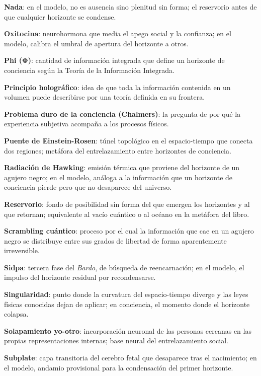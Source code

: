 \glos \textbf{Nada}: en el modelo, no es ausencia sino plenitud sin forma; el reservorio antes de que cualquier horizonte se condense.

\glos \textbf{Oxitocina}: neurohormona que media el apego social y la confianza; en el modelo, calibra el umbral de apertura del horizonte a otros.

\glos \textbf{Phi (Φ)}: cantidad de información integrada que define un horizonte de conciencia según la Teoría de la Información Integrada.

\glos \textbf{Principio holográfico}: idea de que toda la información contenida en un volumen puede describirse por una teoría definida en su frontera.

\glos \textbf{Problema duro de la conciencia (Chalmers)}: la pregunta de por qué la experiencia subjetiva acompaña a los procesos físicos.

\glos \textbf{Puente de Einstein-Rosen}: túnel topológico en el espacio-tiempo que conecta dos regiones; metáfora del entrelazamiento entre horizontes de conciencia.

\glos \textbf{Radiación de Hawking}: emisión térmica que proviene del horizonte de un agujero negro; en el modelo, análoga a la información que un horizonte de conciencia pierde pero que no desaparece del universo.

\glos \textbf{Reservorio}: fondo de posibilidad sin forma del que emergen los horizontes y al que retornan; equivalente al vacío cuántico o al océano en la metáfora del libro.

\glos \textbf{Scrambling cuántico}: proceso por el cual la información que cae en un agujero negro se distribuye entre sus grados de libertad de forma aparentemente irreversible.

\glos \textbf{Sidpa}: tercera fase del \emph{Bardo}, de búsqueda de reencarnación; en el modelo, el impulso del horizonte residual por recondensarse.

\glos \textbf{Singularidad}: punto donde la curvatura del espacio-tiempo diverge y las leyes físicas conocidas dejan de aplicar; en conciencia, el momento donde el horizonte colapsa.

\glos \textbf{Solapamiento yo-otro}: incorporación neuronal de las personas cercanas en las propias representaciones internas; base neural del entrelazamiento social.

\glos \textbf{Subplate}: capa transitoria del cerebro fetal que desaparece tras el nacimiento; en el modelo, andamio provisional para la condensación del primer horizonte.


